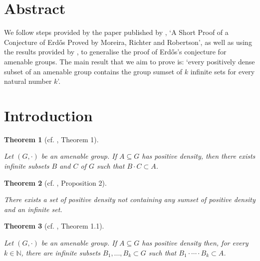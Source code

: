 \documentclass[
  british,
]{article}
\author{Kai Prince}
\date{2025-07-23}
\renewcommand*\contentsname{Table of contents}
\newcommand\contentsname{Table of contents}
\theoremstyle{plain}
\newtheorem{theorem}{Theorem}[section]
\theoremstyle{definition}
\theoremstyle{remark}
\newcommand{\Group}{{G}}
\begin{document}
\renewcommand*\contentsname{Table of contents}
{
\hypersetup{linkcolor=}
\setcounter{tocdepth}{3}
\tableofcontents
}

\section*{Abstract}\label{abstract}

We follow steps provided by the paper published by
, `A Short Proof of a
Conjecture of Erdős Proved by Moreira, Richter and Robertson', as well
as using the results provided by , to generalise the proof of Erdős's conjecture for amenable
groups. The main result that we aim to prove is: `every positively dense
subset of an amenable group contains the group sumset of \(k\) infinite
sets for every natural number \(k\)'.

\section{Introduction}\label{introduction}

\begin{theorem}[cf. , Theorem
1]\protect\hypertarget{thm-GenErdosConjComb}{}\label{thm-GenErdosConjComb}

Let \((\Group,\cdot)\) be an amenable group. If \(A\subseteq G\) has
positive density, then there exists infinite subsets \(B\) and \(C\) of
\(G\) such that \(B\cdot C\subset A\).

\end{theorem}

\begin{theorem}[cf. ,
Proposition
2]\protect\hypertarget{thm-GenErdosConjRel}{}\label{thm-GenErdosConjRel}

There exists a set of positive density not containing any sumset of
positive density and an infinite set.

\end{theorem}

\begin{theorem}[cf. ,
Theorem
1.1]\protect\hypertarget{thm-GenNErdosConjComb}{}\label{thm-GenNErdosConjComb}

Let \((G,\cdot)\) be an amenable group. If \(A\subseteq G\) has positive
density then, for every \(k\in\mathbb{N}\), there are infinite subsets
\(B_1,...,B_k\subset G\) such that \(B_1\cdot\cdots\cdot B_k\subset A\).

\end{theorem}
\end{document}
